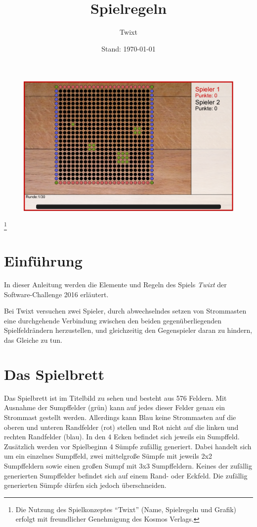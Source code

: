 \documentclass[a4paper, ngerman]{scrartcl}
\title{Spielregeln}
\subtitle{Twixt}
\date{Stand: \today}
\newcommand\blfootnote[1]{%
  \begingroup
  \renewcommand\thefootnote{}\footnote{#1}%
  \addtocounter{footnote}{-1}%
  \endgroup
}
\begin{document}
\maketitle

\begin{figure}[!htbp]
  \centering
  \includegraphics[width=\linewidth]{bilder/gui.png}
\end{figure}
\vspace*{\fill}

\blfootnote{Die Nutzung des Spielkonzeptes "`Twixt"' (Name, Spielregeln und Grafik)
  erfolgt mit freundlicher Genehmigung des Kosmos Verlags.}

\newpage

\section{Einführung}

In dieser Anleitung werden die Elemente und Regeln des Spiels \emph{Twixt} der
Software-Challenge 2016 erläutert.

Bei Twixt versuchen zwei Spieler, durch abwechselndes setzen von Strommasten
eine durchgehende Verbindung zwischen den beiden gegenüberliegenden Spielfeldrändern
herzustellen, und gleichzeitig den Gegenspieler daran zu hindern, das Gleiche zu
tun.

\section{Das Spielbrett}
Das Spielbrett ist im Titelbild zu sehen und besteht aus 576 Feldern.
Mit Ausnahme der Sumpffelder (grün) kann auf jedes dieser Felder genau 
ein Strommast gestellt werden. Allerdings kann Blau keine Strommasten auf 
die oberen und unteren Randfelder (rot) stellen und Rot nicht auf die linken 
und rechten Randfelder (blau). In den 4 Ecken befindet sich jeweils ein
Sumpffeld.
Zusätzlich werden vor Spielbeginn 4 Sümpfe zufällig generiert. Dabei handelt sich um 
ein einzelnes Sumpffeld, zwei mittelgroße Sümpfe mit jeweils 2x2 Sumpffeldern 
sowie einen großen Sumpf mit 3x3 Sumpffeldern. Keines der zufällig generierten Sumpffelder 
befindet sich auf einem Rand- oder Eckfeld. Die zufällig generierten Sümpfe dürfen 
sich jedoch überschneiden.
\end{document}
